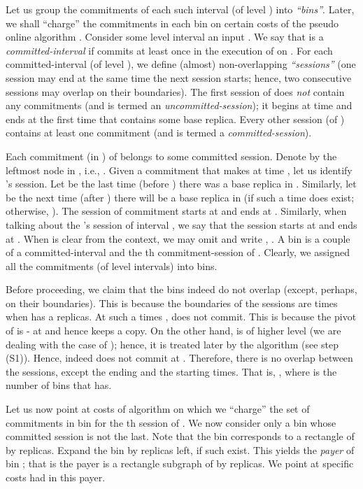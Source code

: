 \documentclass[11pt]{article}
\begin{document}
Let us group the commitments of each such interval (of level ) into {\em ``bins''}.
Later, we shall ``charge'' the commitments in each bin on certain costs of the pseudo online algorithm .
Consider some level  interval  an input .
We say that  is a {\em committed-interval} if  commits at least once in the execution of  on .
For each committed-interval  (of level ),
we define (almost) non-overlapping {\em``sessions''}
(one session may end at the same time the next session starts;
hence, two consecutive sessions may overlap on their boundaries).
The first session of
 does {\em not} contain any commitments (and is termed an {\em uncommitted-session}); it begins at time  and ends at the first time that  contains some base replica.
Every other session (of ) contains at least one commitment (and is termed a {\em committed-session}).


Each commitment (in ) of  belongs to some committed session.
Denote by  the leftmost node in , i.e., .
Given a commitment  that  makes at time ,
let us identify 's session. Let  be the last time (before ) there was a base replica in .
Similarly, let  be the next time (after ) there will be a base replica in 
(if such a time does exist; otherwise, ).
The session of commitment  starts at  and ends at .
Similarly, when talking about the 's session of interval , we say that the session starts at 
and ends at .
When  is clear from the context, we may omit and write , .
A bin is a couple  of a committed-interval and the th commitment-session of .
Clearly, we assigned all the commitments (of level  intervals) into bins.



Before proceeding, we claim that the bins indeed do not overlap (except, perhaps, on their boundaries).
This is because the boundaries of the sessions are times when  has a  replicas.
At such a times ,  does not commit.
This is because the pivot of  is - at  and hence keeps a copy.
On the other hand,  is of higher level
(we are dealing with the case of );
hence, it is treated later by the algorithm (see step (S1)).
Hence,  indeed does not commit at .
Therefore, there is no overlap between the sessions, except the ending and the starting times.
That is, ,
where  is the number of bins that  has.


Let us now point at costs of algorithm  on which we ``charge'' the set of commitments  in bin  for the th session of .
We now consider only a bin  whose  committed session  is not the last.
Note that the bin corresponds to a rectangle of  by  replicas.
Expand the bin by  replicas left, if such exist.
This yields the {\em payer} of bin ; that is the payer is a rectangle subgraph of 
by  replicas.
We point at specific costs  had in this payer.
\end{document}
